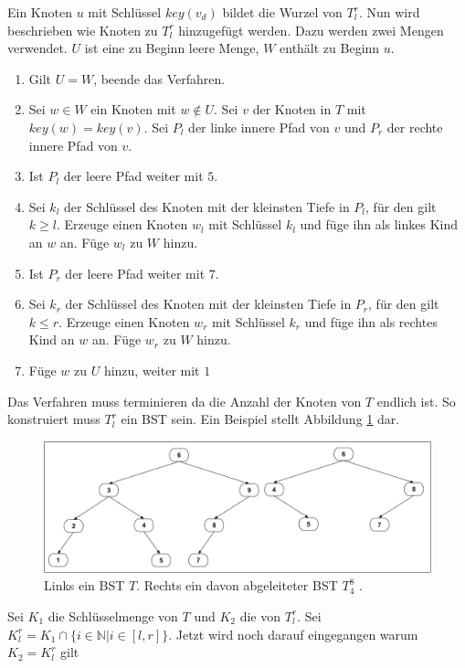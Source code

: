 \documentclass[a4paper,12pt]{article}
\begin{document}
\noindent Ein Knoten $u$ mit Schlüssel $\mathit{key}(v_d)$ bildet die Wurzel von $T^r_l$. Nun wird beschrieben wie Knoten zu $T^r_l$ hinzugefügt werden.
Dazu werden zwei Mengen verwendet. $U$ ist eine zu Beginn leere Menge, $W$ enthält zu Beginn $u$.
\begin{enumerate}
	\item Gilt $U = W$, beende das Verfahren.
	\item Sei $w \in W$ ein Knoten mit $w \notin U$.  Sei $v$ der Knoten in $T$ mit $\mathit{key}(w ) = \mathit{key}(v)$. Sei $P_l$ der linke innere Pfad von $v$ und $P_r$ der rechte innere Pfad von $v$.
	\item Ist $P_l$ der leere Pfad weiter mit $5$.
	\item Sei $k_l$ der Schlüssel des Knoten mit der kleinsten Tiefe in $P_l$, für den gilt $k \geq l$. Erzeuge einen Knoten $w_l$ mit Schlüssel $k_l$ und füge ihn als linkes Kind an $w$ an. Füge $w_l$ zu $W$ hinzu.
	\item Ist $P_r$ der leere Pfad weiter mit $7$.
	\item Sei $k_r$ der Schlüssel des Knoten mit der kleinsten Tiefe in $P_r$, für den gilt  $k \leq r$. Erzeuge einen Knoten $w_r$ mit Schlüssel $k_r$ und füge ihn als rechtes Kind an $w$ an. Füge $w_r$ zu $W$ hinzu.	
	\item Füge $w$ zu $U$ hinzu, weiter mit $1$
\end{enumerate}
Das Verfahren muss terminieren da die Anzahl der Knoten von $T$ endlich ist. So konstruiert muss $T^r_l$ ein BST sein. Ein Beispiel stellt Abbildung \ref{fig:T_r_l} dar. 
\begin{figure}[h]
	\centering
	\includegraphics[width= 1\textwidth]{"Medien/DynOpt/T_r_l"}
	\caption{Links ein BST $T$. Rechts ein davon abgeleiteter BST $T^8_4$ .  }
	\label{fig:T_r_l}
\end{figure}

 \noindent Sei $K_1$ die Schlüsselmenge von $T$ und $K_2$ die von $T^r_l$. Sei ${K^r_l = K_1 \cap \{i \in \mathbb{N}\vert i \in \left[l,r\right] \}}$. Jetzt wird noch darauf eingegangen warum $K_2 = K^r_l$ gilt \\
\end{document}
